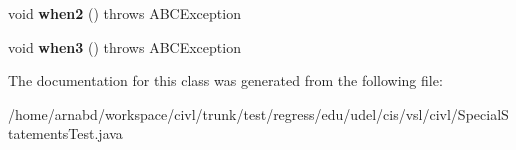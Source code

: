 \begin{DoxyCompactItemize}
\item 
\hypertarget{classedu_1_1udel_1_1cis_1_1vsl_1_1civl_1_1SpecialStatementsTest_ab9bf8ecb8e254e29fd6d197341467907}{}void {\bfseries when2} ()  throws A\+B\+C\+Exception \label{classedu_1_1udel_1_1cis_1_1vsl_1_1civl_1_1SpecialStatementsTest_ab9bf8ecb8e254e29fd6d197341467907}

\item 
\hypertarget{classedu_1_1udel_1_1cis_1_1vsl_1_1civl_1_1SpecialStatementsTest_a9fd8daabcdae321ef678687c77b78c66}{}void {\bfseries when3} ()  throws A\+B\+C\+Exception \label{classedu_1_1udel_1_1cis_1_1vsl_1_1civl_1_1SpecialStatementsTest_a9fd8daabcdae321ef678687c77b78c66}

\end{DoxyCompactItemize}


The documentation for this class was generated from the following file\+:\begin{DoxyCompactItemize}
\item 
/home/arnabd/workspace/civl/trunk/test/regress/edu/udel/cis/vsl/civl/Special\+Statements\+Test.\+java\end{DoxyCompactItemize}
